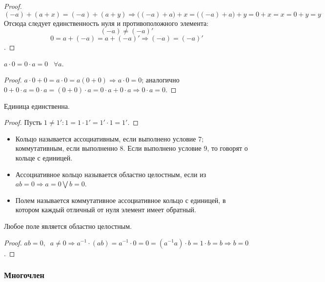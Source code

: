 \begin{proof}
    $$(-a) + (a + x) = (-a)+(a+y) \Rightarrow \big((-a)+a\big) + x = \big((-a) + a \big) + y = 0 + x = x = 0 + y = y$$
    Отсюда следует единственность нуля и противоположного элемента:
    $$(-a) \neq (-a)'$$$$0 = a+(-a)=a+(-a)'\Rightarrow(-a)=(-a)'$$.
\end{proof}

\begin{proposition}
    $a\cdot 0 = 0\cdot a = 0 \;\;\;\forall a$.
\end{proposition}

\begin{proof}
    $a \cdot 0 + 0 = a \cdot 0 = a(0 + 0) \Rightarrow a \cdot 0 = 0$; аналогично $0+0 \cdot a = 0 \cdot a = (0 + 0) \cdot a =0 \cdot a + 0 \cdot a \Rightarrow 0 \cdot a = 0$.
\end{proof}

\begin{proposition}
    Единица единственна.
\end{proposition}

\begin{proof}
    Пусть $1 \neq 1': 1 = 1\cdot 1' = 1'\cdot 1 = 1'$.
\end{proof}

\begin{itemize}
    \item Кольцо называется ассоциативным, если выполнено условие 7; коммутативным, если выполненно 8. Если выполнено условие 9, то говорят о кольце с единицей.
    \item Ассоциативное кольцо называется областно целостным, если из $ab=0\Rightarrow a=0\bigvee b=0$.
    \item Полем называется коммутативное ассоциативное кольцо с единицей, в котором каждый отличный от нуля элемент имеет обратный.
\end{itemize}

\begin{proposition}
    Любое поле является областно целостным.
\end{proposition}

\begin{proof}
    $ab=0, \;\;a \neq 0 \Rightarrow a^{-1} \cdot (ab)=a^{-1} \cdot 0=0=(a^{-1}a) \cdot b=1 \cdot b =b \Rightarrow b=0$.
\end{proof}

\subsubsection{Многочлен}

